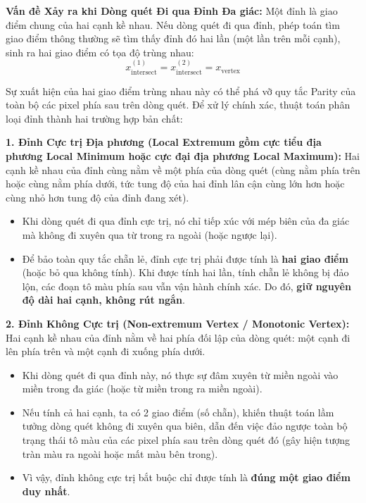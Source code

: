 \textbf{Vấn đề Xảy ra khi Dòng quét Đi qua Đỉnh Đa giác:}
Một đỉnh là giao điểm chung của hai cạnh kề nhau. Nếu dòng quét đi qua đỉnh, phép toán tìm giao điểm thông thường sẽ tìm thấy đỉnh đó hai lần (một lần trên mỗi cạnh), sinh ra hai giao điểm có tọa độ trùng nhau:
\begin{equation}
x_{\text{intersect}}^{(1)} = x_{\text{intersect}}^{(2)} = x_{\text{vertex}}
\end{equation}

Sự xuất hiện của hai giao điểm trùng nhau này có thể phá vỡ quy tắc Parity của toàn bộ các pixel phía sau trên dòng quét. Để xử lý chính xác, thuật toán phân loại đỉnh thành hai trường hợp bản chất:

\textbf{1. Đỉnh Cực trị Địa phương (Local Extremum gồm cực tiểu địa phương Local Minimum hoặc cực đại địa phương Local Maximum):}
Hai cạnh kề nhau của đỉnh cùng nằm về một phía của dòng quét (cùng nằm phía trên hoặc cùng nằm phía dưới, tức tung độ của hai đỉnh lân cận cùng lớn hơn hoặc cùng nhỏ hơn tung độ của đỉnh đang xét).
\begin{itemize}
    \item Khi dòng quét đi qua đỉnh cực trị, nó chỉ tiếp xúc với mép biên của đa giác mà không đi xuyên qua từ trong ra ngoài (hoặc ngược lại).
    \item Để bảo toàn quy tắc chẵn lẻ, đỉnh cực trị phải được tính là \textbf{hai giao điểm} (hoặc bỏ qua không tính). Khi được tính hai lần, tính chẵn lẻ không bị đảo lộn, các đoạn tô màu phía sau vẫn vận hành chính xác. Do đó, \textbf{giữ nguyên độ dài hai cạnh, không rút ngắn}.
\end{itemize}

\textbf{2. Đỉnh Không Cực trị (Non-extremum Vertex / Monotonic Vertex):}
Hai cạnh kề nhau của đỉnh nằm về hai phía đối lập của dòng quét: một cạnh đi lên phía trên và một cạnh đi xuống phía dưới.
\begin{itemize}
    \item Khi dòng quét đi qua đỉnh này, nó thực sự đâm xuyên từ miền ngoài vào miền trong đa giác (hoặc từ miền trong ra miền ngoài).
    \item Nếu tính cả hai cạnh, ta có 2 giao điểm (số chẵn), khiến thuật toán lầm tưởng dòng quét không đi xuyên qua biên, dẫn đến việc đảo ngược toàn bộ trạng thái tô màu của các pixel phía sau trên dòng quét đó (gây hiện tượng tràn màu ra ngoài hoặc mất màu bên trong).
    \item Vì vậy, đỉnh không cực trị bắt buộc chỉ được tính là \textbf{đúng một giao điểm duy nhất}.
\end{itemize}


